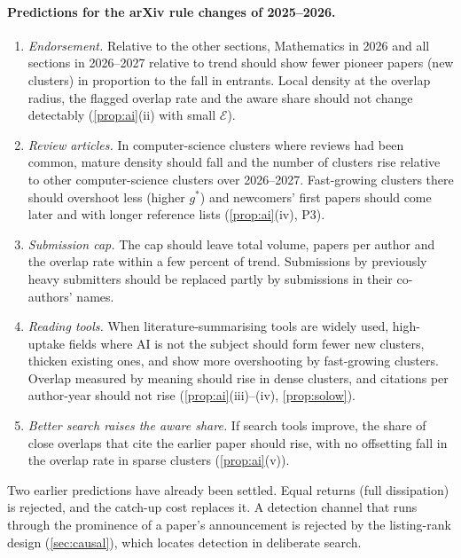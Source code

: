 \paragraph{Predictions for the arXiv rule changes of 2025--2026.}
\begin{enumerate}[label=\textbf{P\arabic*.},leftmargin=*,resume]
\item \emph{Endorsement.} Relative to the other sections, Mathematics in
2026 and all sections in 2026--2027 relative to trend should show fewer pioneer
papers (new clusters) in proportion to the fall in entrants. Local density at
the overlap radius, the flagged overlap rate and the aware share should not
change detectably (\cref{prop:ai}(ii) with small $\mathcal E$).
\item \emph{Review articles.} In computer-science clusters where reviews had been
common, mature density should fall and the number of clusters rise relative to
other computer-science clusters over 2026--2027. Fast-growing clusters there
should overshoot less (higher $g^*$) and newcomers' first papers should come
later and with longer reference lists (\cref{prop:ai}(iv), P3).
\item \emph{Submission cap.} The cap should leave total volume, papers per
author and the overlap rate within a few percent of trend. Submissions by
previously heavy submitters should be replaced partly by submissions in their
co-authors' names.
\item \emph{Reading tools.} When literature-summarising tools are widely used,
high-uptake fields where AI is not the subject should form fewer new clusters,
thicken existing ones, and show more overshooting by fast-growing clusters.
Overlap measured by meaning should rise in dense clusters, and citations per
author-year should not rise (\cref{prop:ai}(iii)--(iv), \cref{prop:solow}).
\item \emph{Better search raises the aware share.} If search tools improve, the
share of close overlaps that cite the earlier paper should rise, with no
offsetting fall in the overlap rate in sparse clusters (\cref{prop:ai}(v)).
\end{enumerate}

Two earlier predictions have already been settled. Equal returns (full
dissipation) is rejected, and the catch-up cost replaces it. A detection
channel that runs through the prominence of a paper's announcement is rejected
by the listing-rank design (\cref{sec:causal}), which locates detection in
deliberate search.
